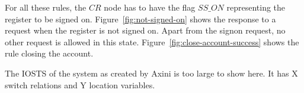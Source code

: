 For all these rules, the $CR$ node has to have the flag $\mathit{SS\_ON}$ representing the register to be signed on. Figure~\ref{fig:not-signed-on} shows the response to a request when the register is not signed on. Apart from the signon request, no other request is allowed in this state. Figure~\ref{fig:close-account-success} shows the rule closing the account.

The IOSTS of the system as created by Axini is too large to show here. It has X switch relations and Y location variables.